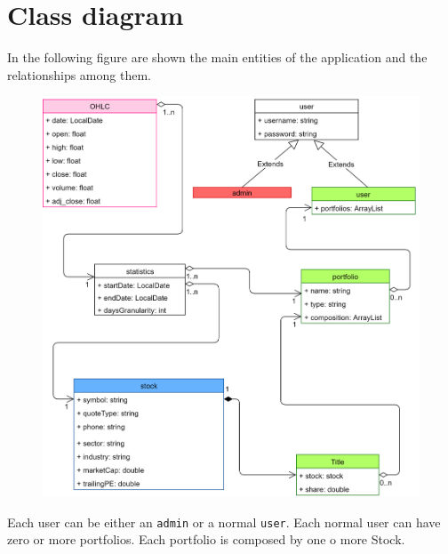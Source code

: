 \section{Class diagram}
In the following figure are shown the main entities of the application and the
relationships among them.
\begin{figure}[H]
	\begin{center}
		\includegraphics[scale=0.20]{img/design_class_diagram_duc.png}
	\end{center}
\end{figure}
\noindent Each user can be either an \texttt{admin} or a normal \texttt{user}. Each normal
user can have zero or more portfolios. Each portfolio is composed by one o more
Stock.
\restoregeometry
